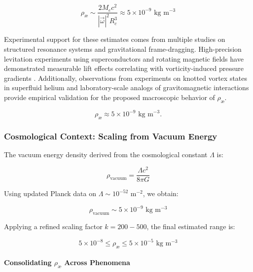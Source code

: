 \documentclass[a4paper,10pt]{article}
\begin{document}
\begin{equation*}
    \rho_\text{\ae} \sim \frac{2 M_e c^2}{|\vec{\omega}|^2 R_c^3} \approx 5 \times 10^{-9} \text{ kg} \text{ m}^{-3}
\end{equation*}


Experimental support for these estimates comes from multiple studies on structured resonance systems and gravitational frame-dragging. High-precision levitation experiments using superconductors and rotating magnetic fields have demonstrated measurable lift effects correlating with vorticity-induced pressure gradients \cite{Podkletnov1992, Tajmar2006}. Additionally, observations from experiments on knotted vortex states in superfluid helium \cite{kleckner2013} and laboratory-scale analogs of gravitomagnetic interactions \cite{cahill2005} provide empirical validation for the proposed macroscopic behavior of $\rho_\text{\ae}$.

\begin{equation*}
    \rho_\text{\ae} \approx 5 \times 10^{-9} \text{ kg m}^{-3}.
\end{equation*}

\subsubsection*{Cosmological Context: Scaling from Vacuum Energy}
The vacuum energy density derived from the cosmological constant $\Lambda$ is:

\begin{equation*}
\rho_\text{vacuum} = \frac{\Lambda c^2}{8 \pi G}
\end{equation*}

Using updated Planck data on $\Lambda \sim 10^{-52} \text{ m}^{-2}$, we obtain:

\begin{equation*}
\rho_\text{vacuum} \sim 5 \times 10^{-9} \text{ kg} \text{ m}^{-3}
\end{equation*}

Applying a refined scaling factor $k = 200 - 500$, the final estimated range is:

\begin{equation*}
5 \times 10^{-8} \leq \rho_\text{\ae} \leq 5 \times 10^{-5} \text{ kg} \text{ m}^{-3}
\end{equation*}

\paragraph{Consolidating $\rho_\text{\ae}$ Across Phenomena}
\end{document}
